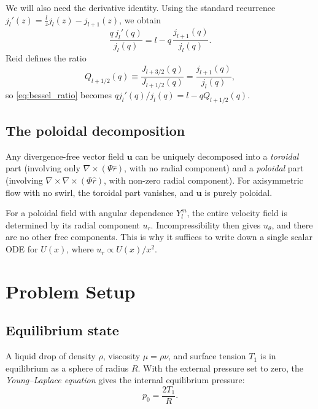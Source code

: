 \documentclass[12pt]{article}
\newcommand{\bu}{\bm{u}}
\theoremstyle{definition}
\begin{document}
We will also need the derivative identity. Using the standard recurrence
$j_l'(z) = \frac{l}{z}j_l(z) - j_{l+1}(z)$, we obtain
\begin{equation}
  \frac{q\,j_l'(q)}{j_l(q)} = l - q\,\frac{j_{l+1}(q)}{j_l(q)}.
  \label{eq:bessel_ratio}
\end{equation}
Reid defines the ratio
\begin{equation}
  Q_{l+1/2}(q) \equiv \frac{J_{l+3/2}(q)}{J_{l+1/2}(q)} = \frac{j_{l+1}(q)}{j_l(q)},
  \label{eq:Q_def}
\end{equation}
so \eqref{eq:bessel_ratio} becomes $q j_l'(q)/j_l(q) = l - q Q_{l+1/2}(q)$.

\subsection{The poloidal decomposition}
\label{sec:poloidal}

Any divergence-free vector field $\bu$ can be uniquely decomposed into a
\emph{toroidal} part (involving only $\nabla\times(\Psi\hat{r})$, with no radial
component) and a \emph{poloidal} part (involving $\nabla\times\nabla\times(\Phi\hat{r})$,
with non-zero radial component). For axisymmetric flow with no swirl, the toroidal
part vanishes, and $\bu$ is purely poloidal.

For a poloidal field with angular dependence $Y_l^m$, the entire velocity field is
determined by its radial component $u_r$. Incompressibility then gives $u_\theta$,
and there are no other free components. This is why it suffices to write down a
single scalar ODE for $U(x)$, where $u_r \propto U(x)/x^2$.


\section{Problem Setup}

\subsection{Equilibrium state}

A liquid drop of density $\rho$, viscosity $\mu = \rho\nu$, and surface tension $T_1$
is in equilibrium as a sphere of radius $R$. With the external pressure set to zero,
the \emph{Young--Laplace equation} gives the internal equilibrium pressure:
\begin{equation}
  p_0 = \frac{2T_1}{R}.
  \label{eq:YL_equilibrium}
\end{equation}
\end{document}
